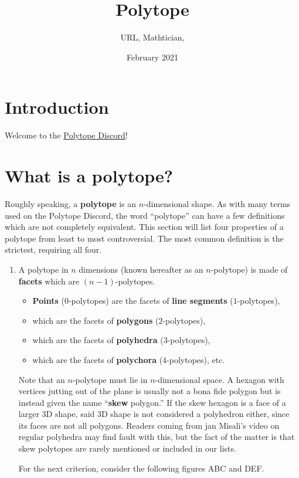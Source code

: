 \documentclass{article}
\title{Polytope}
\author{URL, Mathtician, }
\date{February 2021}
\begin{document}
\maketitle

\section{Introduction}
Welcome to the \href{https://discord.gg/invite/zMRu7T4}{Polytope Discord}!

\section{What is a polytope?}
Roughly speaking, a \textbf{polytope} is an $n$-dimensional shape.
As with many terms used on the Polytope Discord,
the word ``polytope'' can have a few definitions which are not completely equivalent.
This section will list four properties of a polytope from least to most controversial.
The most common definition is the strictest, requiring all four.
\begin{enumerate}
  \item
A polytope in $n$ dimensions (known hereafter as an $n$-polytope)
is made of \textbf{facets} which are $(n-1)$-polytopes.
\begin{itemize}
\item \textbf{Points} ($0$-polytopes) are the facets of \textbf{line segments} ($1$-polytopes),
\item which are the facets of \textbf{polygons} ($2$-polytopes),
\item which are the facets of \textbf{polyhedra} ($3$-polytopes),
\item which are the facets of \textbf{polychora} ($4$-polytopes), etc.
\end{itemize}

Note that an $n$-polytope must lie in $n$-dimensional space.
A hexagon with vertices jutting out of the plane is usually not a bona fide polygon
but is instead given the name ``\textbf{skew} polygon.''
If the skew hexagon is a face of a larger 3D shape,
said 3D shape is not considered a polyhedron either,
since its faces are not all polygons.
Readers coming from jan Misali's video on regular polyhedra may find fault with this,
but the fact of the matter is that
skew polytopes are rarely mentioned or included in our lists.

For the next criterion, consider the following figures ABC and DEF.
\end{enumerate}
\end{document}
